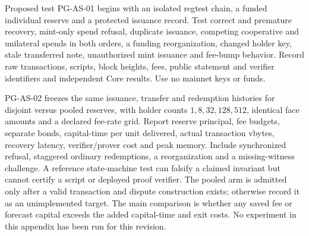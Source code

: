 Proposed test PG-AS-01 begins with an isolated regtest chain, a funded individual reserve and a protected issuance record. Test correct and premature recovery, mint-only spend refusal, duplicate issuance, competing cooperative and unilateral spends in both orders, a funding reorganization, changed holder key, stale transferred note, unauthorized mint issuance and fee-bump behavior. Record raw transactions, scripts, block heights, fees, public statement and verifier identifiers and independent Core results. Use no mainnet keys or funds.

PG-AS-02 freezes the same issuance, transfer and redemption histories for disjoint versus pooled reserves, with holder counts $1,8,32,128,512$, identical face amounts and a declared fee-rate grid. Report reserve principal, fee budgets, separate bonds, capital-time per unit delivered, actual transaction vbytes, recovery latency, verifier/prover cost and peak memory. Include synchronized refusal, staggered ordinary redemptions, a reorganization and a missing-witness challenge. A reference state-machine test can falsify a claimed invariant but cannot certify a script or deployed proof verifier. The pooled arm is admitted only after a valid transaction and dispute construction exists; otherwise record it as an unimplemented target. The main comparison is whether any saved fee or forecast capital exceeds the added capital-time and exit costs. No experiment in this appendix has been run for this revision.
